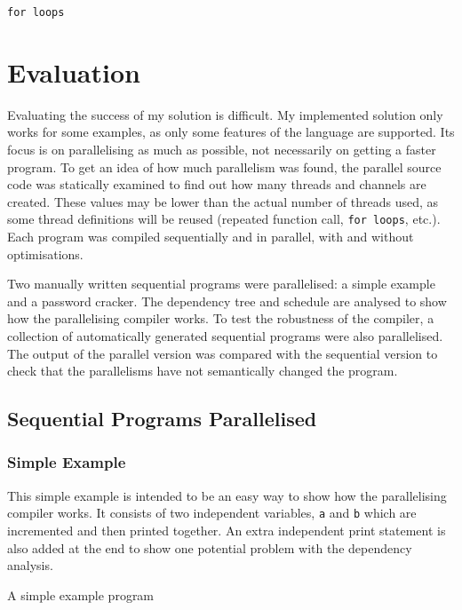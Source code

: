 \texttt{for loops}\chapter{Evaluation}
\label{sec:evaluation}
Evaluating the success of my solution is difficult. My implemented solution only works for some examples, as only some features of the language are supported. Its focus is on parallelising as much as possible, not necessarily on getting a faster program. To get an idea of how much parallelism was found, the parallel source code was statically examined to find out how many threads and channels are created. These values may be lower than the actual number of threads used, as some thread definitions will be reused (repeated function call, \texttt{for loops}, etc.). Each program was compiled sequentially and in parallel, with and without optimisations.

Two manually written sequential programs were parallelised: a simple example and a password cracker. The dependency tree and schedule are analysed to show how the parallelising compiler works. To test the robustness of the compiler, a collection of automatically generated sequential programs were also parallelised. The output of the parallel version was compared with the sequential version to check that the parallelisms have not semantically changed the program.

\section{Sequential Programs Parallelised}
\subsection{Simple Example}
This simple example is intended to be an easy way to show how the parallelising compiler works. It consists of two independent variables, \texttt{a} and \texttt{b} which are incremented and then printed together. An extra independent print statement is also added at the end to show one potential problem with the dependency analysis.

\begin{code}
    \caption{A simple example program}
\end{code}

